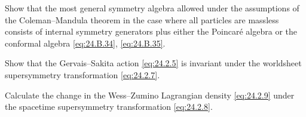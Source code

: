 
\begin{enumerate}
   Show that the most general symmetry algebra allowed under the
  assumptions of the Coleman--Mandula theorem in the case where all
  particles are massless consists of internal symmetry generators plus
  either the Poincar\'e algebra or the conformal algebra
  \eqref{eq:24.B.34}, \eqref{eq:24.B.35}.

   Show that the Gervais--Sakita action \eqref{eq:24.2.5} is invariant
  under the worldsheet supersymmetry transformation \eqref{eq:24.2.7}.

   Calculate the change in the Wess--Zumino Lagrangian density
  \eqref{eq:24.2.9} under the spacetime supersymmetry transformation
  \eqref{eq:24.2.8}.
\end{enumerate}
